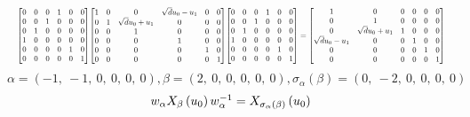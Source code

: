 \documentclass[11pt]{article}
\theoremstyle{definition}
\begin{document}
\[
\scaletoalign{\textwidth}{{\left[\begin{matrix}0 & 0 & 0 & 1 & 0 & 0\\0 & 0 & 1 & 0 & 0 & 0\\0 & 1 & 0 & 0 & 0 & 0\\1 & 0 & 0 & 0 & 0 & 0\\0 & 0 & 0 & 0 & 1 & 0\\0 & 0 & 0 & 0 & 0 & 1\end{matrix}\right]} {\left[\begin{matrix}1 & 0 & 0 & \sqrt{d} u_{0} - u_{1} & 0 & 0\\0 & 1 & \sqrt{d} u_{0} + u_{1} & 0 & 0 & 0\\0 & 0 & 1 & 0 & 0 & 0\\0 & 0 & 0 & 1 & 0 & 0\\0 & 0 & 0 & 0 & 1 & 0\\0 & 0 & 0 & 0 & 0 & 1\end{matrix}\right]} {\left[\begin{matrix}0 & 0 & 0 & 1 & 0 & 0\\0 & 0 & 1 & 0 & 0 & 0\\0 & 1 & 0 & 0 & 0 & 0\\1 & 0 & 0 & 0 & 0 & 0\\0 & 0 & 0 & 0 & 1 & 0\\0 & 0 & 0 & 0 & 0 & 1\end{matrix}\right]} = {\left[\begin{matrix}1 & 0 & 0 & 0 & 0 & 0\\0 & 1 & 0 & 0 & 0 & 0\\0 & \sqrt{d} u_{0} + u_{1} & 1 & 0 & 0 & 0\\\sqrt{d} u_{0} - u_{1} & 0 & 0 & 1 & 0 & 0\\0 & 0 & 0 & 0 & 1 & 0\\0 & 0 & 0 & 0 & 0 & 1\end{matrix}\right]}}
\]
\[
\alpha = \left( -1, \  -1, \  0, \  0, \  0, \  0\right), \beta = \left( 2, \  0, \  0, \  0, \  0, \  0\right), \sigma_{\alpha}(\beta) = \left( 0, \  -2, \  0, \  0, \  0, \  0\right)
\]
\[
\scaletoalign{\textwidth}{w_{\alpha} X_{\beta}\left(u_{0}\right) w_{\alpha}^{-1} = X_{\sigma_{\alpha}\left(\beta\right)}\left(u_{0}\right)}
\]
\end{document}
